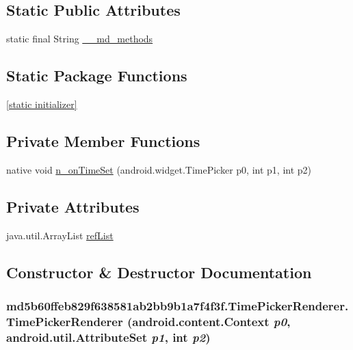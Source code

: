 \subsection*{Static Public Attributes}
\begin{CompactItemize}
\item 
static final String \hyperlink{classmd5b60ffeb829f638581ab2bb9b1a7f4f3f_1_1_time_picker_renderer_3c77da783a54f125d97047436f80a34c}{\_\-\_\-md\_\-methods}
\end{CompactItemize}
\subsection*{Static Package Functions}
\begin{CompactItemize}
\item 
\hyperlink{classmd5b60ffeb829f638581ab2bb9b1a7f4f3f_1_1_time_picker_renderer_a537d43fd640e0635d2def19652ab0be}{\mbox{[}static initializer\mbox{]}}
\end{CompactItemize}
\subsection*{Private Member Functions}
\begin{CompactItemize}
\item 
native void \hyperlink{classmd5b60ffeb829f638581ab2bb9b1a7f4f3f_1_1_time_picker_renderer_2169d0643bdc07403d1330e5ebaf4ba5}{n\_\-onTimeSet} (android.widget.TimePicker p0, int p1, int p2)
\end{CompactItemize}
\subsection*{Private Attributes}
\begin{CompactItemize}
\item 
java.util.ArrayList \hyperlink{classmd5b60ffeb829f638581ab2bb9b1a7f4f3f_1_1_time_picker_renderer_c8725b3e7813e45a02000d4b84812e6f}{refList}
\end{CompactItemize}


\subsection{Constructor \& Destructor Documentation}
\hypertarget{classmd5b60ffeb829f638581ab2bb9b1a7f4f3f_1_1_time_picker_renderer_ea08e098874d7b721d4936ff36f29e0e}{
\subsubsection[{TimePickerRenderer}]{\setlength{\rightskip}{0pt plus 5cm}md5b60ffeb829f638581ab2bb9b1a7f4f3f.TimePickerRenderer.TimePickerRenderer (android.content.Context {\em p0}, \/  android.util.AttributeSet {\em p1}, \/  int {\em p2})}}
\label{classmd5b60ffeb829f638581ab2bb9b1a7f4f3f_1_1_time_picker_renderer_ea08e098874d7b721d4936ff36f29e0e}


